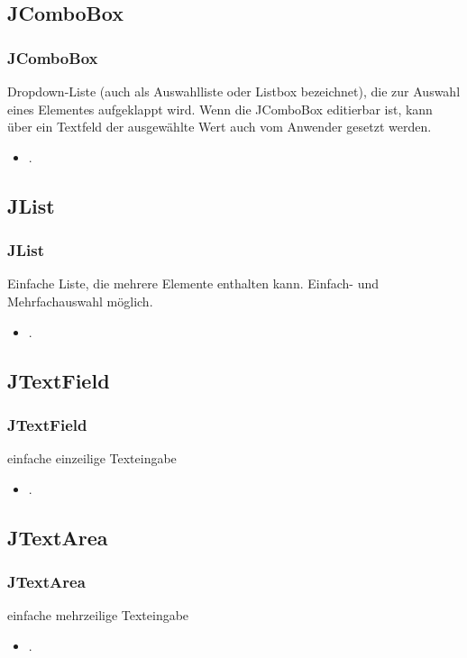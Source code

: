 \documentclass[xcolor=dvipsnames]{beamer}
\begin{document}
\subsection{JComboBox}
\begin{frame} %
  \frametitle{JComboBox} %
  \begin{block}{Dropdown-Liste (auch als Auswahlliste oder Listbox bezeichnet), die zur Auswahl eines Elementes aufgeklappt wird. Wenn die JComboBox editierbar ist, kann über ein Textfeld der ausgewählte Wert auch vom Anwender gesetzt werden.}
	  \begin{itemize}
		\item .
	  \end{itemize}
  \end{block}
\end{frame}


\subsection{JList}
\begin{frame} %
  \frametitle{JList} %
  \begin{block}{Einfache Liste, die mehrere Elemente enthalten kann. Einfach- und Mehrfachauswahl möglich.}
	  \begin{itemize}
		\item .
	  \end{itemize}
  \end{block}
\end{frame}

\subsection{JTextField}
\begin{frame} %
  \frametitle{JTextField
} %
  \begin{block}{einfache einzeilige Texteingabe}
	  \begin{itemize}
		\item .
	  \end{itemize}
  \end{block}
\end{frame}

\subsection{JTextArea}
\begin{frame} %
  \frametitle{JTextArea
} %
  \begin{block}{einfache mehrzeilige Texteingabe}
	  \begin{itemize}
		\item .
	  \end{itemize}
  \end{block}
\end{frame}
\end{document}
